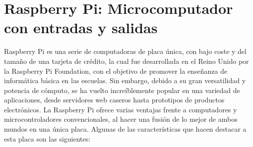 \section{Raspberry Pi: Microcomputador con entradas y salidas}
Raspberry Pi \cite{info:raspberry_pi} es una serie de computadoras de placa única, con  bajo coste y del tamaño de una tarjeta de crédito, la cual fue desarrollada en el Reino Unido por la Raspberry Pi Foundation, con el objetivo de promover la enseñanza de informática básica en las escuelas. Sin embargo, debido a su gran versatilidad y potencia de cómputo, se ha vuelto increíblemente popular en una variedad de aplicaciones, desde servidores web caseros hasta prototipos de productos electrónicos.
La Raspberry Pi ofrece varias ventajas frente a computadores y microcontroladores convencionales, al hacer una fusión de lo mejor de ambos mundos en una única placa. Algunas de las características que hacen destacar a esta placa son las siguientes:
